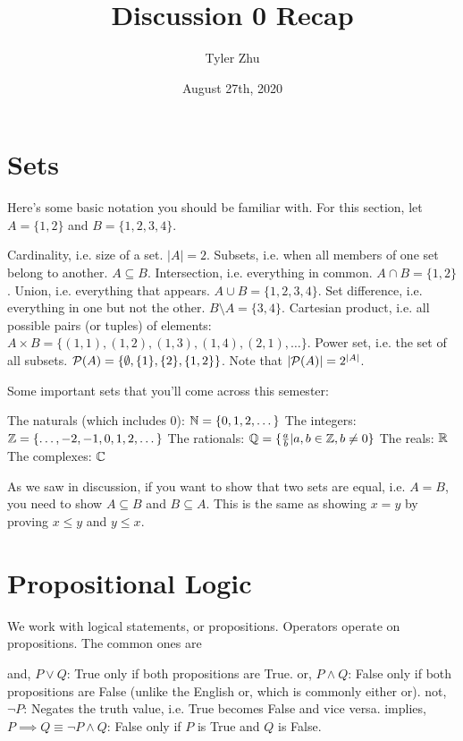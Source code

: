 \documentclass[11 pt]{scrartcl}
\newcommand{\hwtitle}{Discussion 0 Recap}
\begin{document}
 
\title{\Large \hwtitle{}}
\author{\large Tyler Zhu}
\date{August 27th, 2020}

\maketitle 

\section{Sets}
Here's some basic notation you should be familiar with. For this section, let $A = \{1,2\}$ and $B = \{1,2,3,4\}$. 
\begin{itemize}
    \ii Cardinality, i.e. size of a set. $|A| = 2$. 
    \ii Subsets, i.e. when all members of one set belong to another. $A\subseteq B$. 
    \ii Intersection, i.e. everything in common. $A \cap B = \{1,2\}$. 
    \ii Union, i.e. everything that appears. $A \cup B = \{1,2,3,4\}$. 
    \ii Set difference, i.e. everything in one but not the other. $B\setminus A = \{3,4\}$. 
    \ii Cartesian product, i.e. all possible pairs (or tuples) of elements: \\$A\times B = \{(1,1), (1,2), (1,3), (1,4), (2,1), \dots \}$. 
    \ii Power set, i.e. the set of all subsets. $\mathcal P(A) = \{\emptyset, \{1\}, \{2\}, \{1,2\}\}$. Note that $|\mathcal P(A)| = 2^{|A|}$.  
\end{itemize}

Some important sets that you'll come across this semester: 
\begin{itemize}
    \ii The naturals (which includes 0): $\mathbb N = \{0,1,2,\dots \}$ 
    \ii The integers: $\mathbb Z = \{\dots, -2, -1, 0, 1, 2, \dots\}$
    \ii The rationals: $\mathbb Q = \{\frac{a}{b} | a,b\in\mathbb Z, b\not= 0\}$
    \ii The reals: $\mathbb R$
    \ii The complexes: $\mathbb C$
\end{itemize}

As we saw in discussion, if you want to show that two sets are equal, i.e. $A = B$, you need to show $A \subseteq B$ and $B\subseteq A$. This is the same as showing $x=y$ by proving $x\leq y$ and $y\leq x$. 

\section{Propositional Logic}
We work with logical statements, or propositions. Operators operate on propositions. The common ones are
\begin{itemize}
    \ii and, $P\vee Q$: True only if both propositions are True. 
    \ii or, $P\wedge Q$: False only if both propositions are False (unlike the English or, which is commonly either or). 
    \ii not, $\neg P$: Negates the truth value, i.e. True becomes False and vice versa. 
    \ii implies, $P\implies Q \equiv \neg P \wedge Q$: False only if $P$ is True and $Q$ is False. 
\end{itemize}
\end{document}
